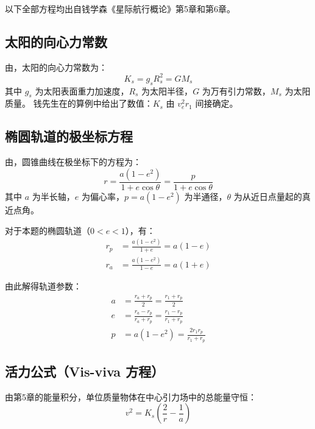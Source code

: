 \documentclass[UTF8,12pt,a4paper]{ctexart}
\begin{document}
以下全部方程均出自钱学森《星际航行概论》\cite{qian2008}第5章和第6章。

\subsection{太阳的向心力常数}

由\cite[\S6.1, pp.~117]{qian2008}，太阳的向心力常数为：
\begin{equation}\label{eq:K}
    K_s = g_s R_s^2 = GM_s
\end{equation}
其中 $g_s$ 为太阳表面重力加速度，$R_s$ 为太阳半径，$G$ 为万有引力常数，$M_s$ 为太阳质量。
钱先生在\cite[\S6.3]{qian2008}的算例中给出了数值：$K_s$ 由 $v_e^2 r_1$ 间接确定。

\subsection{椭圆轨道的极坐标方程}

由\cite[第5章, 式(5.9)]{qian2008}，圆锥曲线在极坐标下的方程为：
\begin{equation}\label{eq:conic}
    r = \frac{a(1-e^2)}{1 + e\cos\theta} = \frac{p}{1 + e\cos\theta}
\end{equation}
其中 $a$ 为半长轴，$e$ 为偏心率，$p = a(1-e^2)$ 为半通径，$\theta$ 为从近日点量起的真近点角。

对于本题的椭圆轨道（$0 < e < 1$），有：
\begin{align}
    r_p &= \frac{a(1-e^2)}{1+e} = a(1-e) \label{eq:rp} \\
    r_a &= \frac{a(1-e^2)}{1-e} = a(1+e) \label{eq:ra}
\end{align}

由此解得轨道参数：
\begin{align}
    a &= \frac{r_a + r_p}{2} = \frac{r_1 + r_p}{2} \label{eq:a} \\
    e &= \frac{r_a - r_p}{r_a + r_p} = \frac{r_1 - r_p}{r_1 + r_p} \label{eq:e} \\[4pt]
    p &= a(1-e^2) = \frac{2r_1 r_p}{r_1 + r_p} \label{eq:p}
\end{align}

\subsection{活力公式（Vis-viva 方程）}

由第5章的能量积分，单位质量物体在中心引力场中的总能量守恒：
\begin{equation}\label{eq:visviva}
    v^2 = K_s\left(\frac{2}{r} - \frac{1}{a}\right)
\end{equation}
\end{document}
